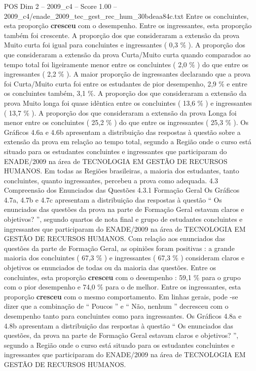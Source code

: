\begin{textsample}{POS Dim 2 – 2009\_c4 – Score 1.00 – 2009\_c4/enade\_2009\_tec\_gest\_rec\_hum\_30bdeaa84c.txt}
Entre os concluintes, esta proporção \textbf{cresceu} com o desempenho.
Entre os ingressantes, esta proporção também foi crescente.
A proporção dos que consideraram a extensão da prova Muito curta foi igual para concluintes e ingressantes ( 0,3 \% ).
A proporção dos que consideraram a extensão da prova Curta/Muito curta quando comparados ao tempo total foi ligeiramente menor entre os concluintes ( 2,0 \% ) do que entre os ingressantes ( 2,2 \% ).
A maior proporção de ingressantes declarando que a prova foi Curta/Muito curta foi entre os estudantes de pior desempenho, 2,9 \% e entre os concluintes também, 3,1 \%.
A proporção dos que consideraram a extensão da prova Muito longa foi quase idêntica entre os concluintes ( 13,6 \% ) e ingressantes ( 13,7 \% ).
A proporção dos que consideraram a extensão da prova Longa foi menor entre os concluintes ( 25,2 \% ) do que entre os ingressantes ( 25,3 \% ).
Os Gráficos 4.6a e 4.6b apresentam a distribuição das respostas à questão sobre a extensão da prova em relação ao tempo total, segundo a Região onde o curso está situado para os estudantes concluintes e ingressantes que participaram do ENADE/2009 na área de TECNOLOGIA EM GESTÃO DE RECURSOS HUMANOS.
Em todas as Regiões brasileiras, a maioria dos estudantes, tanto concluintes, quanto ingressantes, percebeu a prova como adequada. 4.3 Compreensão dos Enunciados das Questões 4.3.1 Formação Geral Os Gráficos 4.7a, 4.7b e 4.7c apresentam a distribuição das respostas à questão “ Os enunciados das questões da prova na parte de Formação Geral estavam claros e objetivos? ”, segundo quartos de nota final e grupo de estudantes concluintes e ingressantes que participaram do ENADE/2009 na área de TECNOLOGIA EM GESTÃO DE RECURSOS HUMANOS.
Com relação aos enunciados das questões da parte de Formação Geral, as opiniões foram positivas : a grande maioria dos concluintes ( 67,3 \% ) e ingressantes ( 67,3 \% ) consideram claros e objetivos os enunciados de todas ou da maioria das questões.
Entre os concluintes, esta proporção \textbf{cresceu} com o desempenho : 59,1 \% para o grupo com o pior desempenho e 74,0 \% para o de melhor.
Entre os ingressantes, esta proporção \textbf{cresceu} com o mesmo comportamento.
Em linhas gerais, pode -se dizer que a combinação de “ Poucos ” e “ Não, nenhum ” decresceu com o desempenho tanto para concluintes como para ingressantes.
Os Gráficos 4.8a e 4.8b apresentam a distribuição das respostas à questão “ Os enunciados das questões, da prova na parte de Formação Geral estavam claros e objetivos? ”, segundo a Região onde o curso está situado para os estudantes concluintes e ingressantes que participaram do ENADE/2009 na área de TECNOLOGIA EM GESTÃO DE RECURSOS HUMANOS.

\end{textsample}
